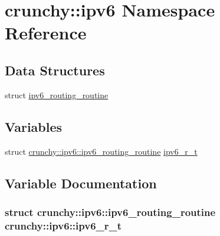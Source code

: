 \hypertarget{namespacecrunchy_1_1ipv6}{}\section{crunchy\+:\+:ipv6 Namespace Reference}
\label{namespacecrunchy_1_1ipv6}
\subsection*{Data Structures}
\begin{DoxyCompactItemize}
\item 
struct \hyperlink{structcrunchy_1_1ipv6_1_1ipv6__routing__routine}{ipv6\+\_\+routing\+\_\+routine}
\end{DoxyCompactItemize}
\subsection*{Variables}
\begin{DoxyCompactItemize}
\item 
struct \hyperlink{structcrunchy_1_1ipv6_1_1ipv6__routing__routine}{crunchy\+::ipv6\+::ipv6\+\_\+routing\+\_\+routine} \hyperlink{namespacecrunchy_1_1ipv6_ab5ac025414ee80694b28111eae0256e6}{ipv6\+\_\+r\+\_\+t}
\end{DoxyCompactItemize}


\subsection{Variable Documentation}
\hypertarget{namespacecrunchy_1_1ipv6_ab5ac025414ee80694b28111eae0256e6}{}
\subsubsection[{ipv6\+\_\+r\+\_\+t}]{\setlength{\rightskip}{0pt plus 5cm}struct {\bf crunchy\+::ipv6\+::ipv6\+\_\+routing\+\_\+routine}  crunchy\+::ipv6\+::ipv6\+\_\+r\+\_\+t}\label{namespacecrunchy_1_1ipv6_ab5ac025414ee80694b28111eae0256e6}
